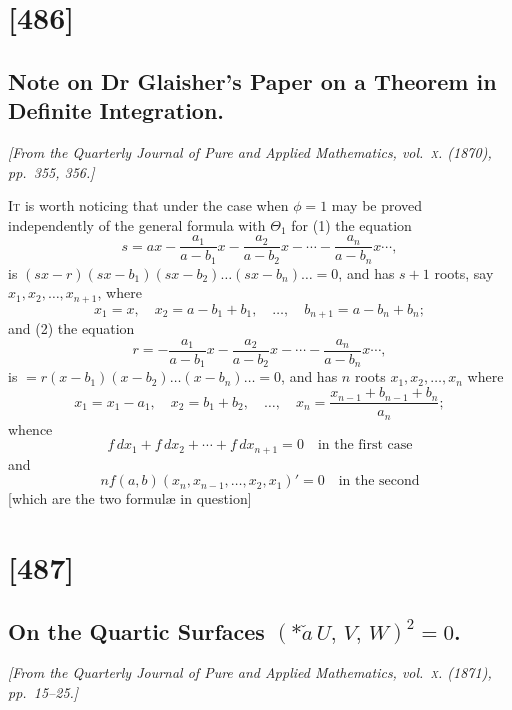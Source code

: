 \documentclass[11pt,a4paper]{article}
\theoremstyle{plain}
\theoremstyle{definition}
\newcommand{\dd}{\,d}
\begin{document}
\section{[486]}
\subsection{Note on Dr Glaisher's Paper on a Theorem in Definite Integration.}

\begin{center}
\textit{[From the Quarterly Journal of Pure and Applied Mathematics, vol.~\textsc{x}. (1870), pp.~355, 356.]}
\end{center}

\textsc{It} is worth noticing that under the case when $\phi=1$ may be proved
independently of the general formula with $\Theta_1$ for (1) the equation
\[
s = a x - \frac{a_1}{a - b_1}x - \frac{a_2}{a - b_2}x - \cdots - \frac{a_n}{a - b_n}x \cdots,
\]
is $(s x - r)(s x - b_1)(s x - b_2) \ldots (s x - b_n) \ldots = 0$,
and has $s + 1$ roots, say $x_1, x_2, \ldots, x_{n+1}$, where
\[
x_1 = x, \quad x_2 = a - b_1 + b_1, \quad \ldots, \quad b_{n+1} = a - b_n + b_n;
\]
and (2) the equation
\[
r = -\frac{a_1}{a - b_1}x - \frac{a_2}{a - b_2}x - \cdots - \frac{a_n}{a - b_n}x \cdots,
\]
is $= r(x - b_1)(x - b_2) \ldots (x - b_n) \ldots = 0$,
and has $n$ roots $x_1, x_2, \ldots, x_n$ where
\[
x_1 = x_1 - a_1, \quad x_2 = b_1 + b_2, \quad \ldots, \quad x_n = \frac{x_{n-1} + b_{n-1} + b_n}{a_n};
\]
whence
\[
f \dd x_1 + f \dd x_2 + \cdots + f \dd x_{n+1} = 0 \quad \text{in the first case}
\]
and
\[
n f(a, b)(x_n, x_{n-1}, \ldots, x_2, x_1)' = 0 \quad \text{in the second}
\]
\textnormal{[which are the two formul\ae{} in question]}

\clearpage

\section{[487]}
\subsection{On the Quartic Surfaces $(*\!\check{a}\,U,\,V,\,W)^2=0$.}

\begin{center}
\textit{[From the Quarterly Journal of Pure and Applied Mathematics, vol.~\textsc{x}. (1871), pp.~15--25.]}
\end{center}
\end{document}
